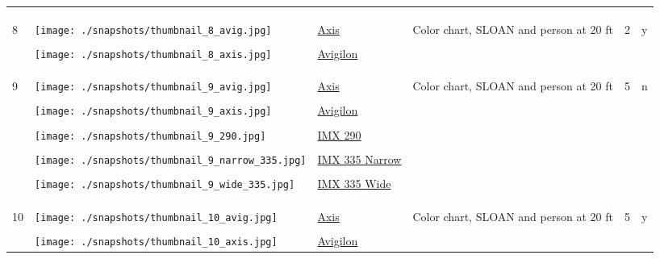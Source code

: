 \documentclass{article}%
\begin{document}
\begin{longtabu}{m{2.5cm} m{4cm} m{2cm} m{4cm} m{2cm} m{2cm}}
&&&&&\\%
&&&&&\\%
\hline%
&&&&&\\%
8&\texttt{[image: ./snapshots/thumbnail\_8\_avig.jpg]}&\href{https://drive.google.com/file/d/14cIMk3ZYZZCvw1nAD0fRTxo28oA1ogvI/view?usp=sharing}{Axis}&Color chart, SLOAN and person at 20 ft&2&y\\%
&&&&&\\%
&\texttt{[image: ./snapshots/thumbnail\_8\_axis.jpg]}&\href{https://drive.google.com/file/d/1A_SxVHRQX8rmbWH5cGcsMGikNiDyZSml/view?usp=sharing}{Avigilon}&&&\\%
&&&&&\\%
&&&&&\\%
\hline%
&&&&&\\%
9&\texttt{[image: ./snapshots/thumbnail\_9\_avig.jpg]}&\href{https://drive.google.com/file/d/1YCU7vebcL7eO_ZGqAgCnGZIpcDul43uZ/view?usp=sharing}{Axis}&Color chart, SLOAN and person at 20 ft&5&n\\%
&&&&&\\%
&\texttt{[image: ./snapshots/thumbnail\_9\_axis.jpg]}&\href{https://drive.google.com/file/d/1LzHFQiYuwZNWtuOkiawDhspTknJ8DwJH/view?usp=sharing}{Avigilon}&&&\\%
&&&&&\\%
&\texttt{[image: ./snapshots/thumbnail\_9\_290.jpg]}&\href{https://drive.google.com/file/d/1DLe9z3Dr9TVWF2tRS5Ypo15iZtBdAsvj/view?usp=sharing}{IMX 290}&&&\\%
&&&&&\\%
&\texttt{[image: ./snapshots/thumbnail\_9\_narrow\_335.jpg]}&\href{https://drive.google.com/file/d/1rHpJo7NgVPW9f7ONsCkVo1-bUFzcvzRF/view?usp=sharing}{IMX 335 Narrow}&&&\\%
&&&&&\\%
&\texttt{[image: ./snapshots/thumbnail\_9\_wide\_335.jpg]}&\href{https://drive.google.com/file/d/1LIcg7o4FFqLeUKn56Vzv8ajf_F6IyUZD/view?usp=sharing}{IMX 335 Wide}&&&\\%
&&&&&\\%
&&&&&\\%
\hline%
&&&&&\\%
10&\texttt{[image: ./snapshots/thumbnail\_10\_avig.jpg]}&\href{https://drive.google.com/file/d/1vM27J4I5hL6cYPRTmNqgFSs_SZfDPXHu/view?usp=sharing}{Axis}&Color chart, SLOAN and person at 20 ft&5&y\\%
&&&&&\\%
&\texttt{[image: ./snapshots/thumbnail\_10\_axis.jpg]}&\href{https://drive.google.com/file/d/1SzFi0skR9C1gUljNtYF_WleA63xNEG7g/view?usp=sharing}{Avigilon}&&&\\%

\end{longtabu}
\end{document}
